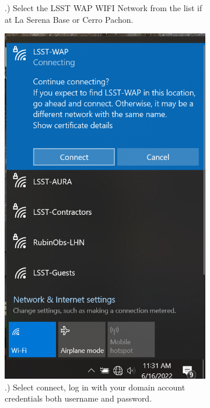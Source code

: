 \begin{figure}
\begin{subfigure}{0.35\textwidth}
      .) Select the LSST WAP WIFI Network from the list if at La Serena Base or Cerro Pachon.
    \end{subfigure}
      \hfill
    \begin{subfigure}{0.35\textwidth}
      \includegraphics[width=\textwidth]{Images/Windows2.png}
      .) Select connect, log in with your domain account credentials both username and password. 
    \end{subfigure}
  \end{figure}
 
